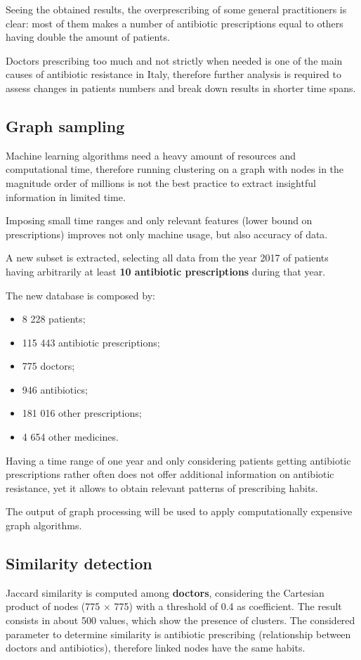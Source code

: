Seeing the obtained results, the overprescribing of some general practitioners is clear: most of them makes a number of antibiotic prescriptions equal to others having double the amount of patients.

Doctors prescribing too much and not strictly when needed is one of the main causes of antibiotic resistance in Italy, therefore further analysis is required to assess changes in patients numbers and break down results in shorter time spans.

\subsection{Graph sampling}
Machine learning algorithms need a heavy amount of resources and computational time, therefore running clustering on a graph with nodes in the magnitude order of millions is not the best practice to extract insightful information in limited time.

Imposing small time ranges and only relevant features (lower bound on prescriptions) improves not only machine usage, but also accuracy of data. 

A new subset is extracted, selecting all data from the year 2017 of patients having arbitrarily at least \textbf{10 antibiotic prescriptions} during that year.

The new database is composed by:
\begin{itemize}
	\item 8 228 patients;
	\item 115 443 antibiotic prescriptions;
	\item 775 doctors;
	\item 946 antibiotics;
	\item 181 016 other prescriptions;
	\item 4 654 other medicines.
\end{itemize}

Having a time range of one year and only considering patients getting antibiotic prescriptions rather often does not offer additional information on antibiotic resistance, yet it allows to obtain relevant patterns of prescribing habits.

The output of graph processing will be used to apply computationally expensive graph algorithms. 

\subsection{Similarity detection}
Jaccard similarity is computed among \textbf{doctors}, considering the Cartesian product of nodes (775 $\times$ 775) with a threshold of 0.4 as coefficient. The result consists in about 500 values, which show the presence of clusters. The considered parameter to determine similarity is antibiotic prescribing (relationship between doctors and antibiotics), therefore linked nodes have the same habits.

